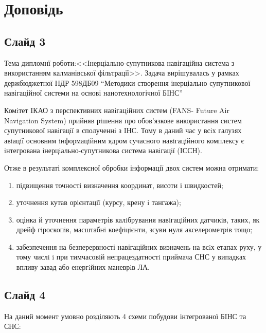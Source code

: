 \documentclass[ukrainian,utf8,simple,floatsubsection, hpadding=1mm,equationsubsection,12pt]{eskdtext}
\begin{document}
\footnotesize
\section*{Доповідь}
\subsection*{Слайд 3}

Тема дипломнї роботи:<<Інерціально-супутникова навігаційна система з використанням калманівської фільтрації>>. Задача вирішувалась у рамках держбюджетної НДР 598ДБ09 ``Методики створення інерціально супутникової навігаційної системи на основі нанотехнологічної БІНС”

Комiтет IКАО з перспективних навiгацiйних систем (FANS- Future Air Navigation System) прийняв рiшення про обов’язкове використання систем супутникової навiгацiї в сполученнi з IНС. Тому в даний час у всiх галузях авiацiї
основним iнформацiйним ядром сучасного навiгацiйного комплексу є iнтегрована iнерцiально-супутникова система навiгацiї (IССН).


Отже в результаті комплексної обробки інформації двох систем можна отримати:

\begin{enumerate}
\item  підвищення точності визначення координат, висоти і швидкостей;
\item  уточнення кутав орієнтації (курсу, крену i тангажа);
\item  оцінка й уточнення параметрів калiбрування навiгацiйних датчикiв,
таких, як дрейф гiроскопiв, масштабнi коефiцiєнти, зсуви нуля акселерометрiв тощо;
\item  забезпечення на безперервності навігаційних визначень на всiх етапах руху, у тому числi i при тимчасовiй непрацездатностi приймача СНС у випадках впливу завад або енергiйних маневрiв ЛА.
\end{enumerate}

\subsection*{Слайд 4}
На даний момент умовно розділяють 4 схеми побудови інтегрованої БІНС та СНС:
\end{document}
